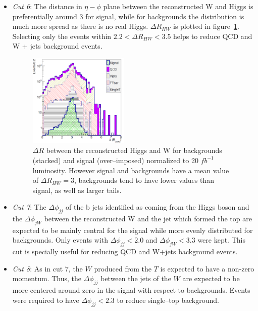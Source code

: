 \begin{itemize}
\item \textit{Cut 6}: The distance in $\eta-\phi$ plane between the reconstructed W and Higgs is preferentially around 3 for signal, while for backgrounds the distribution is much more spread as there is no real Higgs. $\Delta R_{HW}$ is plotted in figure~\ref{fig:Var3}. Selecting only the events within $2.2<\Delta R_{HW}<3.5$ helps to reduce QCD and W + jets background events.

\begin{figure}[!Hhtbp]
  \begin{center}
    \includegraphics[width=0.45\textwidth]{figs/Pheno/DRWH.png}
    \caption{$\Delta R$ between the reconstructed Higgs and W for backgrounds (stacked) and signal (over--imposed) normalized to 20 $fb^{-1}$ luminosity. However signal and backgrounds have a mean value of $\Delta R_{HW}=3$, backgrounds tend to have lower values than signal, as well as larger tails.}
    \label{fig:Var3}
  \end{center}
\end{figure}

\item \textit{Cut 7}: The $\Delta \phi_{jj}$ of the b jets identified as coming from the Higgs boson and the $\Delta \phi_{jW}$ between the reconstructed W and the jet which formed the top are expected to be mainly central for the signal while more evenly distributed for backgrounds. Only events with $\Delta \phi_{jj}<2.0$ and $\Delta \phi_{jW}<3.3$ were kept. This cut is specially useful for reducing QCD and W+jets background events.

\item \textit{Cut 8}: As in cut 7, the $W$ produced from the $T$ is expected to have a non-zero momentum. Thus, the $\Delta \phi_{jj}$ between the jets of the $W$ are expected to be more centered around zero in the signal with respect to backgrounds. Events were required to have $\Delta \phi_{jj}<2.3$ to reduce single--top background.


\end{itemize}
